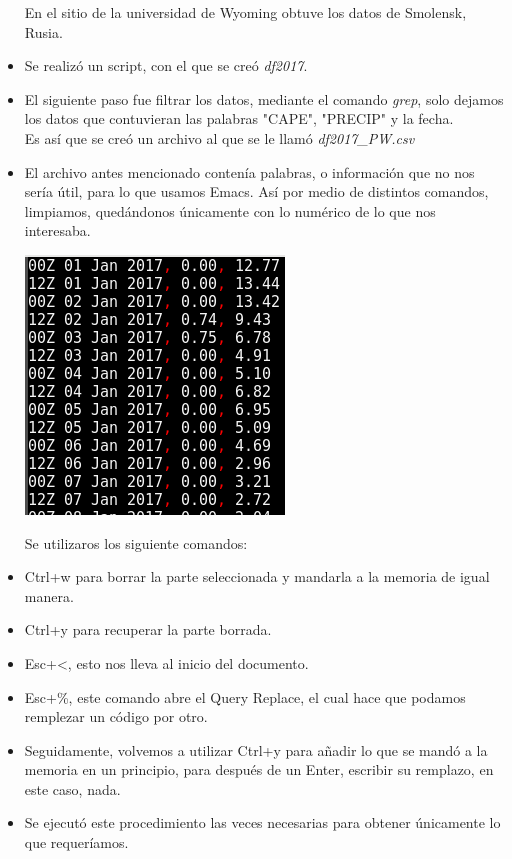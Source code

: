 \documentclass{article}
\begin{document}
\begin{doublespace}
\begin{itemize}
En el sitio de la universidad de Wyoming obtuve los datos de Smolensk, Rusia.
\item Se realizó un script, con el que se creó \textit{df2017}.
\item El siguiente paso fue filtrar los datos, mediante el comando \textit{grep}, solo dejamos los datos que contuvieran las palabras "CAPE", "PRECIP" y la fecha.\\
Es así que se creó un archivo al que se le llamó \textit{df2017\_PW.csv}
\item El archivo antes mencionado contenía palabras, o información que no nos sería útil, para lo que usamos Emacs. Así por medio de distintos comandos, limpiamos, quedándonos únicamente con lo numérico de lo que nos interesaba. 
\\
\begin{center}
\includegraphics[scale=0.5]{act51.png}
\end{center}
Se utilizaros los siguiente comandos:
\\
\item Ctrl+w para borrar la parte seleccionada y mandarla a la memoria de igual manera.
\item Ctrl+y para recuperar la parte borrada.
\item Esc+<, esto nos lleva al inicio del documento.
\item Esc+\%, este comando abre el Query Replace, el cual hace que podamos remplezar un código por otro.
\item Seguidamente, volvemos a utilizar Ctrl+y para añadir lo que se mandó a la memoria en un principio, para después de un Enter, escribir su remplazo, en este caso, nada.
\item Se ejecutó este procedimiento las veces necesarias para obtener únicamente lo que requeríamos.


\end{itemize}
\end{doublespace}
\end{document}
